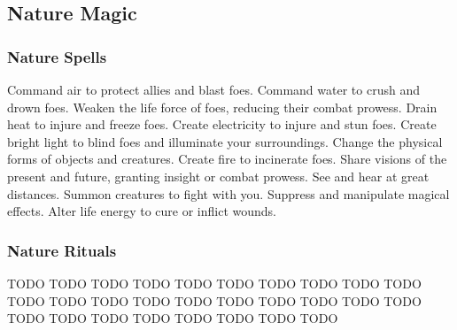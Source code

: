 \subsection{Nature Magic}\label{Nature Magic}
\subsubsection{Nature Spells}\label{Nature Spells}
\begin{spelllist}
 Command air to protect allies and blast foes.
 Command water to crush and drown foes.
 Weaken the life force of foes, reducing their combat prowess.
 Drain heat to injure and freeze foes.
 Create electricity to injure and stun foes.
 Create bright light to blind foes and illuminate your surroundings.
 Change the physical forms of objects and creatures.
 Create fire to incinerate foes.
 Share visions of the present and future, granting insight or combat prowess.
 See and hear at great distances.
 Summon creatures to fight with you.
 Suppress and manipulate magical effects.
 Alter life energy to cure or inflict wounds.
\end{spelllist}
\subsubsection{Nature Rituals}\label{Nature Rituals}
\begin{spelllist}
 TODO
 TODO
 TODO
 TODO
 TODO
 TODO
 TODO
 TODO
 TODO
 TODO
 TODO
 TODO
 TODO
 TODO
 TODO
 TODO
 TODO
 TODO
 TODO
 TODO
 TODO
 TODO
 TODO
 TODO
 TODO
 TODO
 TODO
 TODO
\end{spelllist}

